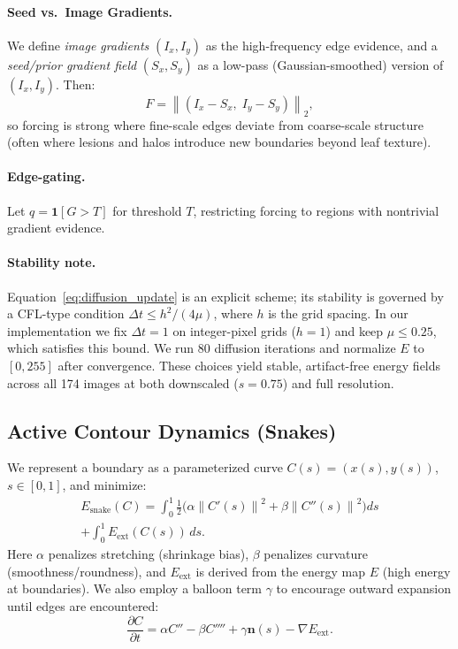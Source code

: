 \documentclass[11pt,a4paper]{article}
\newcommand{\grad}{\nabla}
\newcommand{\norm}[1]{\left\lVert #1 \right\rVert}
\begin{document}
\paragraph{Seed vs.\ Image Gradients.}
We define \emph{image gradients} $(I_x,I_y)$ as the high-frequency edge evidence, and a \emph{seed/prior gradient field} $(S_x,S_y)$ as a low-pass (Gaussian-smoothed) version of $(I_x,I_y)$. Then:
\begin{equation}
F = \norm{(I_x-S_x,\; I_y-S_y)}_2,
\end{equation}
so forcing is strong where fine-scale edges deviate from coarse-scale structure (often where lesions and halos introduce new boundaries beyond leaf texture).

\paragraph{Edge-gating.}
Let $q = \mathbf{1}[G > T]$ for threshold $T$, restricting forcing to regions with nontrivial gradient evidence.

\paragraph{Stability note.}
Equation~\eqref{eq:diffusion_update} is an explicit scheme; its stability is governed by a CFL-type condition $\Delta t \leq h^2/(4\mu)$, where $h$ is the grid spacing. In our implementation we fix $\Delta t = 1$ on integer-pixel grids ($h=1$) and keep $\mu\leq 0.25$, which satisfies this bound. We run 80 diffusion iterations and normalize $E$ to $[0,255]$ after convergence. These choices yield stable, artifact-free energy fields across all 174 images at both downscaled ($s{=}0.75$) and full resolution.

\subsection{Active Contour Dynamics (Snakes)}
We represent a boundary as a parameterized curve $C(s) = (x(s), y(s))$, $s\in[0,1]$, and minimize:
\begin{multline}
E_{\mathrm{snake}}(C) = \int_0^1 \tfrac{1}{2}\Big(\alpha \norm{C'(s)}^2 + \beta \norm{C''(s)}^2\Big)ds \\
 + \int_0^1 E_{\mathrm{ext}}(C(s))\,ds.
\end{multline}
Here $\alpha$ penalizes stretching (shrinkage bias), $\beta$ penalizes curvature (smoothness/roundness), and $E_{\mathrm{ext}}$ is derived from the energy map $E$ (high energy at boundaries). We also employ a balloon term $\gamma$ to encourage outward expansion until edges are encountered:
\begin{equation}
\frac{\partial C}{\partial t} = \alpha C'' - \beta C'''' + \gamma \mathbf{n}(s) - \grad E_{\mathrm{ext}}.
\end{equation}
\end{document}
